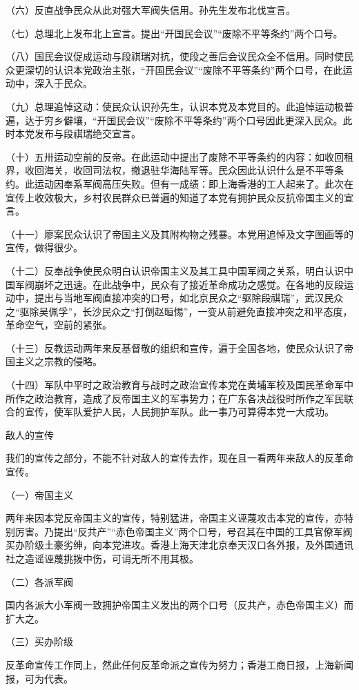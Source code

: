 （六）反直战争民众从此对强大军阀失信用。孙先生发布北伐宣言。

（七）总理北上发布北上宣言。提出“开国民会议”“废除不平等条约”两个口号。

（八）国民会议促成运动与段祺瑞对抗，使段之善后会议民众全不信用。同时使民众更深切的认识本党政治主张，“开国民会议”“废除不平等条约”两个口号，在此运动中，深入于民众。

（九）总理追悼这动：使民众认识孙先生，认识本党及本党目的。此追悼运动极普遍，达于穷乡僻壤，“开国民会议”“废除不平等条约”两个口号因此更深入民众。此时本党发布与段祺瑞绝交宣言。

（十）五卅运动空前的反帝。在此运动中提出了废除不平等条约的内容：如收回租界，收回海关，收回司法权，撤退驻华海陆军等。民众因此认识什么是不平等条约。此运动因奉系军阀高压失败。但有一成绩：即上海香港的工人起来了。此次在宣传上收效极大，乡村农民群众已普遍的知道了本党有拥护民众反抗帝国主义的宣言。

（十一）廖案民众认识了帝国主义及其附构物之残暴。本党用追悼及文字图画等的宣传，做得很少。

（十二）反奉战争使民众明白认识帝国主义及其工具中国军阀之关系，明白认识中国军阀崩坏之迅速。在此战争中，民众有了接近革命成功之感觉。在各地的反段运动中，提出与当地军阀直接冲突的口号，如北京民众之“驱除段祺瑞”，武汉民众之“驱除吴佩孚”，长沙民众之“打倒赵晅惕”，一变从前避免直接冲突之和平态度，革命空气，空前的紧张。

（十三）反教运动两年来反基督敬的组织和宣传，遍于全国各地，使民众认识了帝国主义之宗教的侵略。

（十四）军队中平时之政治教育与战时之政治宣传本党在黄埔军校及国民革命军中所作之政治教育，造成了反帝国主义的军事势力；在广东各决战役时所作之军民联合的宣传，使军队爱护人民，人民拥护军队。此一事乃可算得本党一大成功。

敌人的宣传

我们的宣传之部分，不能不针对敌人的宣传去作，现在且一看两年来敌人的反革命宣传。

（一）帝国主义

两年来因本党反帝国主义的宣传，特别猛进，帝国主义诬蔑攻击本党的宣传，亦特别厉害。乃提出“反共产”“赤色帝国主义”两个口号，号召其在中国的工具官僚军阀买办阶级土豪劣绅，向本党进攻。香港上海天津北京奉天汉口各外报，及外国通讯社之造谣诬蔑挑拨中伤，可诮无所不用其极。

（二）各派军阀

国内各派大小军阀一致拥护帝国主义发出的两个口号（反共产，赤色帝国主义）而扩大之。

（三）买办阶级

反革命宣传工作同上，然此任何反革命派之宣传为努力；香港工商日报，上海新闻报，可为代表。

